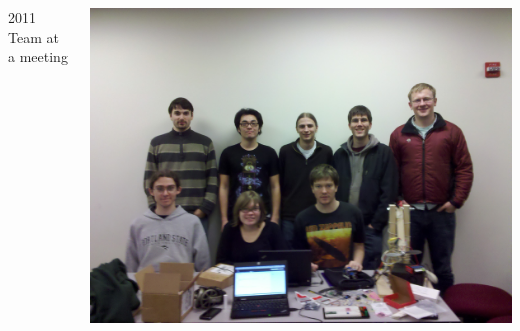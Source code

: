 \documentclass{beamer}
\begin{document}
{\begin{columns}[c]
        \begin{center}
        2011 Team at a meeting \\
        \end{center}
        \includegraphics[width=1\textwidth]{grouppic2011.jpg}
        \end{columns}
}
\end{document}
